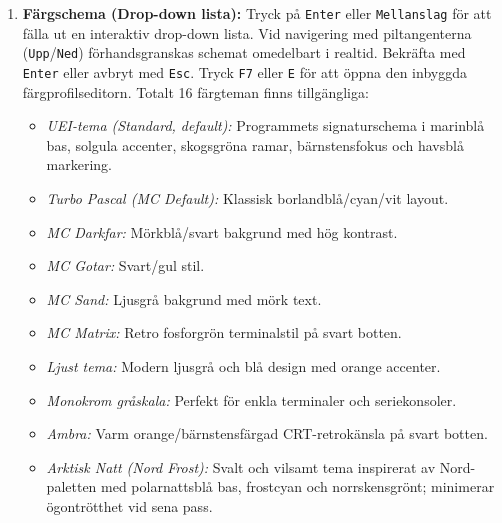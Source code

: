 \documentclass[11pt,a4paper]{article}
\begin{document}
\begin{enumerate}
\begin{itemize}
        \item \emph{Automatisk:} Varje sparat QSO loggas omedelbart mot QRZ.com Logbook API i realtid när du trycker \texttt{Enter}.
        \item \emph{Manuell:} Direktloggning utförs endast på begäran med snabbkommandot \texttt{Ctrl+L} i formuläret eller för markerade rader i loggen.
        \item \emph{Av:} Ingen direktloggning sker mot QRZ.com.
    \end{itemize}
    Default är \emph{Manuell} om användarnamn och lösenord angetts i inställningarna. Statusraden visar resultat (\texttt{QRZ: OK} eller specifik felkod). Vid godkänd loggning markeras kontakten direkt som hanterad (\texttt{✓}).
    \item \textbf{Färgschema (Drop-down lista):} Tryck på \texttt{Enter} eller \texttt{Mellanslag} för att fälla ut en interaktiv drop-down lista. Vid navigering med piltangenterna (\texttt{Upp}/\texttt{Ned}) förhandsgranskas schemat omedelbart i realtid. Bekräfta med \texttt{Enter} eller avbryt med \texttt{Esc}. Tryck \texttt{F7} eller \texttt{E} för att öppna den inbyggda färgprofilseditorn. Totalt 16 färgteman finns tillgängliga:
    \begin{itemize}
        \item \emph{UEI-tema (Standard, default):} Programmets signaturschema i marinblå bas, solgula accenter, skogsgröna ramar, bärnstensfokus och havsblå markering.
        \item \emph{Turbo Pascal (MC Default):} Klassisk borlandblå/cyan/vit layout.
        \item \emph{MC Darkfar:} Mörkblå/svart bakgrund med hög kontrast.
        \item \emph{MC Gotar:} Svart/gul stil.
        \item \emph{MC Sand:} Ljusgrå bakgrund med mörk text.
        \item \emph{MC Matrix:} Retro fosforgrön terminalstil på svart botten.
        \item \emph{Ljust tema:} Modern ljusgrå och blå design med orange accenter.
        \item \emph{Monokrom gråskala:} Perfekt för enkla terminaler och seriekonsoler.
        \item \emph{Ambra:} Varm orange/bärnstensfärgad CRT-retrokänsla på svart botten.
        \item \emph{Arktisk Natt (Nord Frost):} Svalt och vilsamt tema inspirerat av Nord-paletten med polarnattsblå bas, frostcyan och norrskensgrönt; minimerar ögontrötthet vid sena pass.

\end{itemize}
\end{enumerate}
\end{document}
